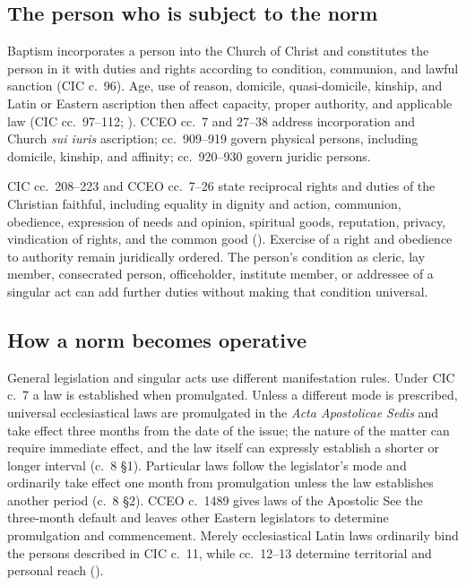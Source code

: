 \subsection{The person who is subject to the norm}

Baptism incorporates a person into the Church of Christ and constitutes the person in it with duties and rights according to condition, communion, and lawful sanction (CIC c.~96). Age, use of reason, domicile, quasi-domicile, kinship, and Latin or Eastern ascription then affect capacity, proper authority, and applicable law (CIC cc.~97--112; ). CCEO cc.~7 and 27--38 address incorporation and Church \emph{sui iuris} ascription; cc.~909--919 govern physical persons, including domicile, kinship, and affinity; cc.~920--930 govern juridic persons.

CIC cc.~208--223 and CCEO cc.~7--26 state reciprocal rights and duties of the Christian faithful, including equality in dignity and action, communion, obedience, expression of needs and opinion, spiritual goods, reputation, privacy, vindication of rights, and the common good (). Exercise of a right and obedience to authority remain juridically ordered. The person's condition as cleric, lay member, consecrated person, officeholder, institute member, or addressee of a singular act can add further duties without making that condition universal.

\subsection{How a norm becomes operative}

General legislation and singular acts use different manifestation rules. Under CIC c.~7 a law is established when promulgated. Unless a different mode is prescribed, universal ecclesiastical laws are promulgated in the \emph{Acta Apostolicae Sedis} and take effect three months from the date of the issue; the nature of the matter can require immediate effect, and the law itself can expressly establish a shorter or longer interval (c.~8 \S1). Particular laws follow the legislator's mode and ordinarily take effect one month from promulgation unless the law establishes another period (c.~8 \S2). CCEO c.~1489 gives laws of the Apostolic See the three-month default and leaves other Eastern legislators to determine promulgation and commencement. Merely ecclesiastical Latin laws ordinarily bind the persons described in CIC c.~11, while cc.~12--13 determine territorial and personal reach ().

